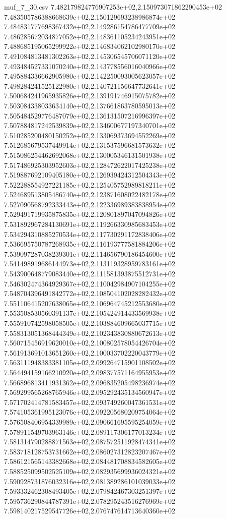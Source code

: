 \begin{filecontents*}{muf_7_30.csv}
7.482179824776907253e+02,2.150973071862290453e+02
7.483505786388668639e+02,2.150129693238986874e+02
7.484831777698367432e+02,2.149286154786477709e+02
7.486285672034877052e+02,2.148361105234243951e+02
7.488685195065299922e+02,2.146834062102980170e+02
7.491084813481302263e+02,2.145306545706071120e+02
7.493484527331070240e+02,2.143778556016040966e+02
7.495884336662905980e+02,2.142250093005623057e+02
7.498284241525122980e+02,2.140721156647732641e+02
7.500684241965935826e+02,2.139191746915075782e+02
7.503084338033634140e+02,2.137661863780595013e+02
7.505484529776487079e+02,2.136131507216996397e+02
7.507884817242539839e+02,2.134600677197340701e+02
7.510285200480150252e+02,2.133069373694552269e+02
7.512685679537449914e+02,2.131537596681573632e+02
7.515086254462692068e+02,2.130005346131501938e+02
7.517486925303952603e+02,2.128472622017425238e+02
7.519887692109405180e+02,2.126939424312504343e+02
7.522288554927221185e+02,2.125405752989818211e+02
7.524689513805486740e+02,2.123871608022482178e+02
7.527090568792333443e+02,2.122336989383838954e+02
7.529491719935875835e+02,2.120801897047094826e+02
7.531892967284130691e+02,2.119266330985683453e+02
7.534294310885270534e+02,2.117730291172838406e+02
7.536695750787268935e+02,2.116193777581884206e+02
7.539097287038239301e+02,2.114656790186454600e+02
7.541498919686144973e+02,2.113119328959783161e+02
7.543900648779083440e+02,2.111581393875512731e+02
7.546302474364929367e+02,2.110042984907104255e+02
7.548704396491842772e+02,2.108504102028282432e+02
7.551106415207638065e+02,2.106964745212553680e+02
7.553508530560391137e+02,2.105424914433569938e+02
7.555910742598058505e+02,2.103884609665037715e+02
7.558313051368444349e+02,2.102343830880672613e+02
7.560715456919620010e+02,2.100802578054426704e+02
7.561913691013651260e+02,2.100033702220043779e+02
7.563111948383381105e+02,2.099264715901108502e+02
7.564494159166210920e+02,2.098377571164955953e+02
7.566896813411931362e+02,2.096835205498236974e+02
7.569299565268765946e+02,2.095292435134560947e+02
7.571702414781583457e+02,2.093749260047361531e+02
7.574105361995123076e+02,2.092205680209754064e+02
7.576508406954339989e+02,2.090661695595254059e+02
7.578911549703963146e+02,2.089117306177013234e+02
7.581314790288871563e+02,2.087572511928474341e+02
7.583718128753731662e+02,2.086027312823207467e+02
7.586121565143382668e+02,2.084481708834582605e+02
7.588525099502525109e+02,2.082935699936024321e+02
7.590928731876032316e+02,2.081389286101039033e+02
7.593332462308493405e+02,2.079842467303251397e+02
7.595736290844787391e+02,2.078295243516276969e+02
7.598140217529547726e+02,2.076747614713640360e+02

\end{filecontents*}
